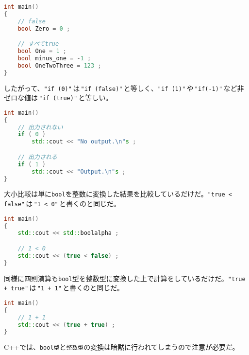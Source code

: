 \begin{lstlisting}[language={C++}]
int main()
{
    // false
    bool Zero = 0 ;

    // すべてtrue
    bool One = 1 ;
    bool minus_one = -1 ;
    bool OneTwoThree = 123 ;  
}
\end{lstlisting}

したがって、\texttt{"if (0)"}\,は\,\texttt{"if (false)"}\,と等しく、\texttt{"if (1)"}\,や\,\texttt{"if(-1)"}\,など非ゼロな値は{\break}\,\texttt{"if (true)"}\,と等しい。

\begin{lstlisting}[language={C++}]
int main()
{
    // 出力されない
    if ( 0 )
        std::cout << "No output.\n"s ;

    // 出力される
    if ( 1 )
        std::cout << "Output.\n"s ;
}
\end{lstlisting}

大小比較は単に\texttt{bool}を整数に変換した結果を比較しているだけだ。\texttt{"true < false"}\,は\,\texttt{"1 < 0"}\,と書くのと同じだ。

\begin{lstlisting}[language={C++}]
int main()
{
    std::cout << std::boolalpha ;

    // 1 < 0
    std::cout << (true < false) ;
}
\end{lstlisting}

同様に四則演算も\texttt{bool}型を整数型に変換した上で計算をしているだけだ。\texttt{"true + true"}\,は{\break}\,\texttt{"1 + 1"}\,と書くのと同じだ。

\begin{lstlisting}[language={C++}]
int main()
{
    // 1 + 1
    std::cout << (true + true) ;
}
\end{lstlisting}

C++では、\texttt{bool型}と\texttt{整数型}の変換は暗黙に行われてしまうので注意が必要だ。
